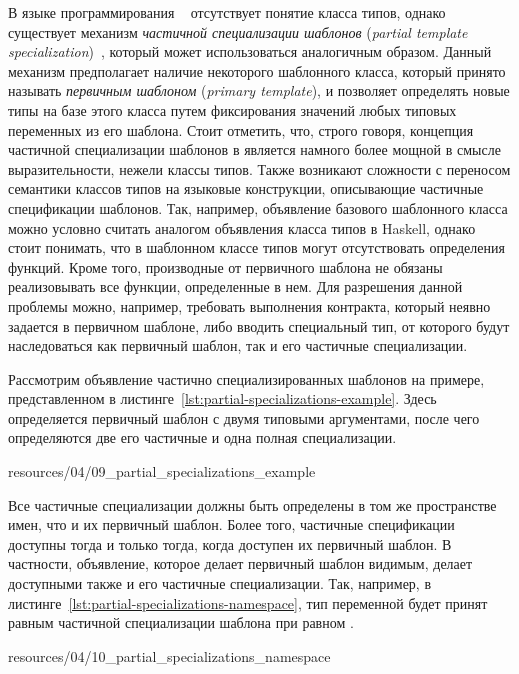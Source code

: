 В языке программирования \cpp~\cite{Stroustrup13} отсутствует понятие класса типов, однако существует механизм \emph{частичной специализации шаблонов} (\emph{partial template specialization})~\cite{AbrahamsG04, Alexandrescu01}, который может использоваться аналогичным образом. Данный механизм предполагает наличие некоторого шаблонного класса, который принято называть \emph{первичным шаблоном} (\emph{primary template}), и позволяет определять новые типы на базе этого класса путем фиксирования значений любых типовых переменных из его шаблона. Стоит отметить, что, строго говоря, концепция частичной специализации шаблонов в \cpp является намного более мощной в смысле выразительности, нежели классы типов. Также возникают сложности с переносом семантики классов типов на языковые конструкции, описывающие частичные спецификации шаблонов. Так, например, объявление базового шаблонного класса можно условно считать аналогом объявления класса типов в Haskell, однако стоит понимать, что в шаблонном классе типов могут отсутствовать определения функций. Кроме того, производные от первичного шаблона не обязаны реализовывать все функции, определенные в нем. Для разрешения данной проблемы можно, например, требовать выполнения контракта, который неявно задается в первичном шаблоне, либо вводить специальный тип, от которого будут наследоваться как первичный шаблон, так и его частичные специализации.

Рассмотрим объявление частично специализированных шаблонов на примере, представленном в листинге~\ref{lst:partial-specializations-example}. Здесь определяется первичный шаблон  с двумя типовыми аргументами, после чего определяются две его частичные и одна полная специализации. 


{resources/04/09_partial_specializations_example}

Все частичные специализации должны быть определены в том же пространстве имен, что и их первичный шаблон. Более того, частичные спецификации доступны тогда и только тогда, когда доступен их первичный шаблон. В частности, объявление, которое делает первичный шаблон видимым, делает доступными также и его частичные специализации. Так, например, в листинге~\ref{lst:partial-specializations-namespace}, тип переменной  будет принят равным частичной специализации шаблона  при  равном .


{resources/04/10_partial_specializations_namespace}

